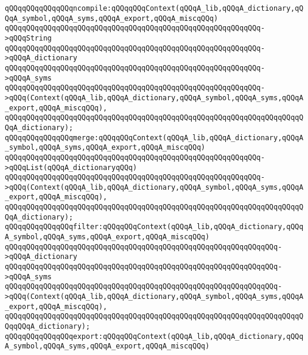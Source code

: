 \newline
\verb|qQQqqQQqqQQqqQQqncompile:qQQqqQQqContext(qQQqA_lib,qQQqA_dictionary,qQQqA_symbol,qQQqA_syms,qQQqA_export,qQQqA_miscqQQq)|\newline
\verb|qQQqqQQqqQQqqQQqqQQqqQQqqQQqqQQqqQQqqQQqqQQqqQQqqQQqqQQqqQQq->qQQqString|\newline
\verb|qQQqqQQqqQQqqQQqqQQqqQQqqQQqqQQqqQQqqQQqqQQqqQQqqQQqqQQqqQQq->qQQqA_dictionary|\newline
\verb|qQQqqQQqqQQqqQQqqQQqqQQqqQQqqQQqqQQqqQQqqQQqqQQqqQQqqQQqqQQq->qQQqA_syms|\newline
\verb|qQQqqQQqqQQqqQQqqQQqqQQqqQQqqQQqqQQqqQQqqQQqqQQqqQQqqQQqqQQq->qQQq(Context(qQQqA_lib,qQQqA_dictionary,qQQqA_symbol,qQQqA_syms,qQQqA_export,qQQqA_miscqQQq),|\newline
\verb|qQQqqQQqqQQqqQQqqQQqqQQqqQQqqQQqqQQqqQQqqQQqqQQqqQQqqQQqqQQqqQQqqQQqqQQqA_dictionary);|\newline
\newline
\verb|qQQqqQQqqQQqqQQqmerge:qQQqqQQqContext(qQQqA_lib,qQQqA_dictionary,qQQqA_symbol,qQQqA_syms,qQQqA_export,qQQqA_miscqQQq)|\newline
\verb|qQQqqQQqqQQqqQQqqQQqqQQqqQQqqQQqqQQqqQQqqQQqqQQqqQQqqQQqqQQq->qQQqList(qQQqA_dictionaryqQQq)|\newline
\verb|qQQqqQQqqQQqqQQqqQQqqQQqqQQqqQQqqQQqqQQqqQQqqQQqqQQqqQQqqQQq->qQQq(Context(qQQqA_lib,qQQqA_dictionary,qQQqA_symbol,qQQqA_syms,qQQqA_export,qQQqA_miscqQQq),|\newline
\verb|qQQqqQQqqQQqqQQqqQQqqQQqqQQqqQQqqQQqqQQqqQQqqQQqqQQqqQQqqQQqqQQqqQQqqQQqA_dictionary);|\newline
\newline
\verb|qQQqqQQqqQQqqQQqfilter:qQQqqQQqContext(qQQqA_lib,qQQqA_dictionary,qQQqA_symbol,qQQqA_syms,qQQqA_export,qQQqA_miscqQQq)|\newline
\verb|qQQqqQQqqQQqqQQqqQQqqQQqqQQqqQQqqQQqqQQqqQQqqQQqqQQqqQQqqQQqqQQq->qQQqA_dictionary|\newline
\verb|qQQqqQQqqQQqqQQqqQQqqQQqqQQqqQQqqQQqqQQqqQQqqQQqqQQqqQQqqQQqqQQq->qQQqA_syms|\newline
\verb|qQQqqQQqqQQqqQQqqQQqqQQqqQQqqQQqqQQqqQQqqQQqqQQqqQQqqQQqqQQqqQQq->qQQq(Context(qQQqA_lib,qQQqA_dictionary,qQQqA_symbol,qQQqA_syms,qQQqA_export,qQQqA_miscqQQq),|\newline
\verb|qQQqqQQqqQQqqQQqqQQqqQQqqQQqqQQqqQQqqQQqqQQqqQQqqQQqqQQqqQQqqQQqqQQqqQQqqQQqA_dictionary);|\newline
\newline
\verb|qQQqqQQqqQQqqQQqexport:qQQqqQQqContext(qQQqA_lib,qQQqA_dictionary,qQQqA_symbol,qQQqA_syms,qQQqA_export,qQQqA_miscqQQq)|\newline
